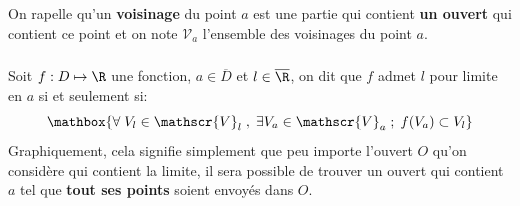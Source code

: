 \chapter*{} %
On rapelle qu'un \textbf{voisinage} du point \(a\) est une partie qui contient \textbf{un ouvert} qui contient ce point et on note \(\mathscr{V}_a\) l'ensemble des voisinages du point \(a\).

\subsection*{}

Soit \(f : D \mapsto \R\) une fonction, \(a \in \overline{D}\) et \(l \in \overline{\R}\), on dit que \(f\) admet \(l\) pour limite en \(a\) si et seulement si:
\[
   \mathbox{\forall \; V_l \in \mathscr{V}_l \; , \; \exists  V_a \in \mathscr{V}_a \; ; \; f(V_a) \subset V_l }   
\]
Graphiquement, cela signifie simplement que peu importe l'ouvert \(O\) qu'on considère qui contient la limite, il sera possible de trouver un ouvert qui contient \(a\) tel que \textbf{tout ses points} soient envoyés dans \(O\).


